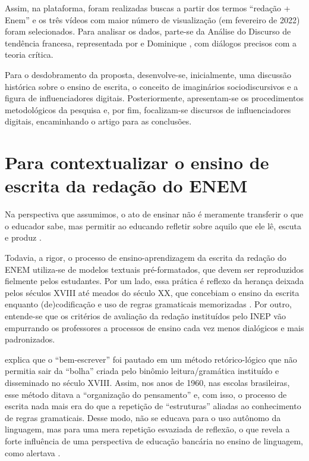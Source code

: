 \documentclass[portuguese]{textolivre}
\begin{document}
Assim, na plataforma, foram realizadas buscas a partir dos termos “redação + Enem” e os três vídeos com maior número de visualização (em fevereiro de 2022) foram selecionados. Para analisar os dados, parte-se da Análise do Discurso de tendência francesa, representada por \textcite{charaudeau_os_2017,charaudeau_discurso_2018} e Dominique \textcite{maingueneau_proposito_2008,maingueneau_analise_2012}, com diálogos precisos com a teoria crítica. 

Para o desdobramento da proposta, desenvolve-se, inicialmente, uma discussão histórica sobre o ensino de escrita, o conceito de imaginários sociodiscursivos e a figura de influenciadores digitais. Posteriormente, apresentam-se os procedimentos metodológicos da pesquisa e, por fim, focalizam-se discursos de influenciadores digitais, encaminhando o artigo para as conclusões.

\section{Para contextualizar o ensino de escrita da redação do ENEM}\label{sec-normas}
Na perspectiva que assumimos, o ato de ensinar não é meramente transferir o que o educador sabe, mas permitir ao educando refletir sobre aquilo que ele lê, escuta e produz \cite{freire_pedagogia_1996}.

Todavia, a rigor, o processo de ensino-aprendizagem da escrita da redação do ENEM utiliza-se de modelos textuais pré-formatados, que devem ser reproduzidos fielmente pelos estudantes. Por um lado, essa prática é reflexo da herança deixada pelos séculos XVIII até meados do século XX, que concebiam o ensino da escrita enquanto (de)codificação e uso de regras gramaticais memorizadas \cite{bunzen_da_2006}. Por outro, entende-se que os critérios de avaliação da redação instituídos pelo INEP vão empurrando os professores a processos de ensino cada vez menos dialógicos e mais padronizados.  

\textcite{bonini_metodologias_2002} explica que o “bem-escrever” foi pautado em um método retórico-lógico que não permitia sair da “bolha” criada pelo binômio leitura/gramática instituído e disseminado no século XVIII. Assim, nos anos de 1960, nas escolas brasileiras, esse método ditava a “organização do pensamento” e, com isso, o processo de escrita nada mais era do que a repetição de “estruturas” aliadas ao conhecimento de regras gramaticais. Desse modo, não se educava para o uso autônomo da linguagem, mas para uma mera repetição esvaziada de reflexão, o que revela a forte influência de uma perspectiva de educação bancária no ensino de linguagem, como alertava \textcite{freire_pedagogia_1996}. 
\end{document}
